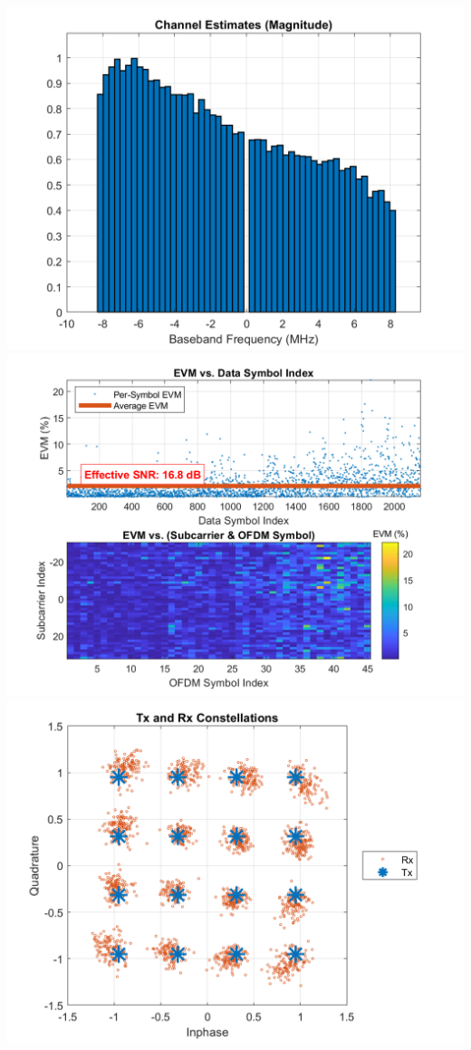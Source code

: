 \documentclass[12pt]{report}
\begin{document}
\includegraphics[width=\columnwidth]{CHANNEL_EST_TO_COMPARE_PSD.png}
\includegraphics[width=\columnwidth]{EVM_GROWTH_OFDM_16_FRM_45.png}
\includegraphics[width=\columnwidth]{phase_drift_OFDM_16QAM_45_FRM.png}
\end{document}
